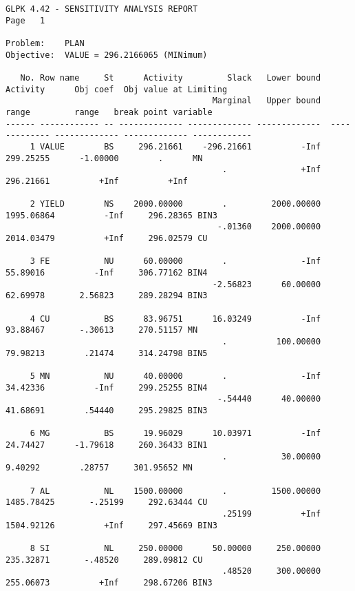 \begin{landscape}
\begin{scriptsize}
\begin{verbatim}
GLPK 4.42 - SENSITIVITY ANALYSIS REPORT                                                                         Page   1

Problem:    PLAN
Objective:  VALUE = 296.2166065 (MINimum)

   No. Row name     St      Activity         Slack   Lower bound       Activity      Obj coef  Obj value at Limiting
                                          Marginal   Upper bound          range         range   break point variable
------ ------------ -- ------------- ------------- -------------  ------------- ------------- ------------- ------------
     1 VALUE        BS     296.21661    -296.21661          -Inf      299.25255      -1.00000        .      MN
                                            .               +Inf      296.21661          +Inf          +Inf

     2 YIELD        NS    2000.00000        .         2000.00000     1995.06864          -Inf     296.28365 BIN3
                                           -.01360    2000.00000     2014.03479          +Inf     296.02579 CU

     3 FE           NU      60.00000        .               -Inf       55.89016          -Inf     306.77162 BIN4
                                          -2.56823      60.00000       62.69978       2.56823     289.28294 BIN3

     4 CU           BS      83.96751      16.03249          -Inf       93.88467       -.30613     270.51157 MN
                                            .          100.00000       79.98213        .21474     314.24798 BIN5

     5 MN           NU      40.00000        .               -Inf       34.42336          -Inf     299.25255 BIN4
                                           -.54440      40.00000       41.68691        .54440     295.29825 BIN3

     6 MG           BS      19.96029      10.03971          -Inf       24.74427      -1.79618     260.36433 BIN1
                                            .           30.00000        9.40292        .28757     301.95652 MN

     7 AL           NL    1500.00000        .         1500.00000     1485.78425       -.25199     292.63444 CU
                                            .25199          +Inf     1504.92126          +Inf     297.45669 BIN3

     8 SI           NL     250.00000      50.00000     250.00000      235.32871       -.48520     289.09812 CU
                                            .48520     300.00000      255.06073          +Inf     298.67206 BIN3
\end{verbatim}
\end{scriptsize}
\end{landscape}

